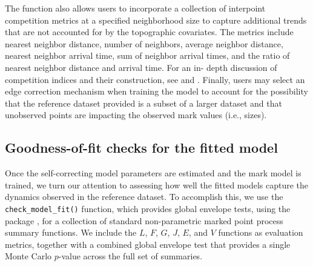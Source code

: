 The function also allows users to incorporate a collection of interpoint competition
metrics at a specified neighborhood size to capture additional trends
that are not accounted for by the topographic covariates. The metrics
include nearest neighbor distance, number of neighbors, average neighbor
distance, nearest neighbor arrival time, sum of neighbor arrival times,
and the ratio of nearest neighbor distance and arrival time. For an in-
depth discussion of competition indices and their construction, see
\citet{pommereningTammReviewTree2018} and \citet{contrerasEvaluatingTreeCompetition2011}. Finally, users may select an
edge correction mechanism when training the model to account for the
possibility that the reference dataset provided is a subset of a larger
dataset and that unobserved points are impacting the observed mark
values (i.e., sizes).

\subsection{Goodness-of-fit checks for the fitted model}\label{goodness-of-fit-checks-for-the-fitted-model}

Once the self-correcting model parameters are estimated and the mark
model is trained, we turn our attention to assessing how well the fitted
models capture the dynamics observed in the reference dataset. To
accomplish this, we use the \texttt{check\_model\_fit()} function, which
provides global envelope tests, using the  package
\citep{myllymakiGlobalEnvelopeTests2017}, for a collection of standard
non-parametric marked point process summary functions. {We include the \(L\), \(F\), \(G\), \(J\), \(E\), and \(V\) functions as evaluation metrics, together with a combined global envelope test that provides a single Monte Carlo \(p\)-value across the full set of summaries.}

